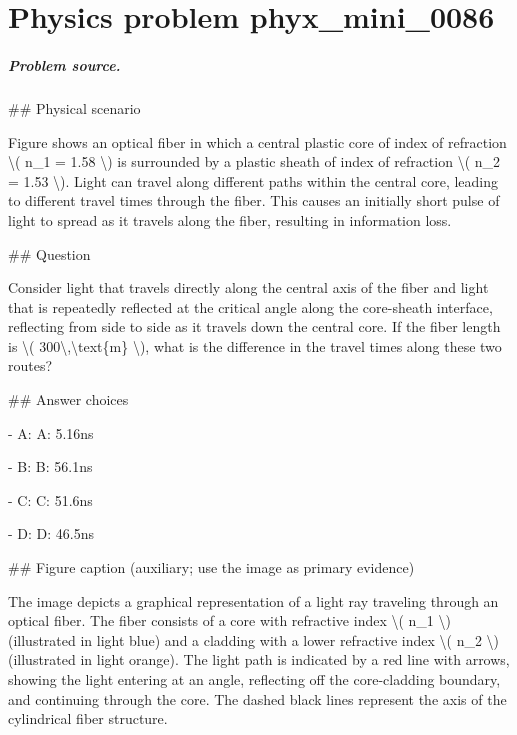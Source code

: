 
\chapter{Physics problem phyx\_mini\_0086}
\label{ch:PhyXMiniProblems_problem_phyx_mini_0086}

\paragraph{Problem source.}
\#\# Physical scenario

Figure shows an optical fiber in which a central plastic core of index of refraction \textbackslash{}( n\_1 = 1.58 \textbackslash{}) is surrounded by a plastic sheath of index of refraction \textbackslash{}( n\_2 = 1.53 \textbackslash{}). Light can travel along different paths within the central core, leading to different travel times through the fiber. This causes an initially short pulse of light to spread as it travels along the fiber, resulting in information loss.

\#\# Question

Consider light that travels directly along the central axis of the fiber and light that is repeatedly reflected at the critical angle along the core-sheath interface, reflecting from side to side as it travels down the central core. If the fiber length is \textbackslash{}( 300\textbackslash{},\textbackslash{}text\{m\} \textbackslash{}), what is the difference in the travel times along these two routes?

\#\# Answer choices

- A: A: 5.16ns

- B: B: 56.1ns

- C: C: 51.6ns

- D: D: 46.5ns

\#\# Figure caption (auxiliary; use the image as primary evidence)

The image depicts a graphical representation of a light ray traveling through an optical fiber. The fiber consists of a core with refractive index \textbackslash{}( n\_1 \textbackslash{}) (illustrated in light blue) and a cladding with a lower refractive index \textbackslash{}( n\_2 \textbackslash{}) (illustrated in light orange). The light path is indicated by a red line with arrows, showing the light entering at an angle, reflecting off the core-cladding boundary, and continuing through the core. The dashed black lines represent the axis of the cylindrical fiber structure.

